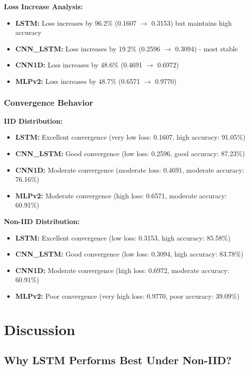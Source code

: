 \documentclass[12pt,a4paper]{article}
\begin{document}
\textbf{Loss Increase Analysis:}
\begin{itemize}
    \item \textbf{LSTM:} Loss increases by 96.2\% (0.1607 $\rightarrow$ 0.3153) but maintains high accuracy
    \item \textbf{CNN\_LSTM:} Loss increases by 19.2\% (0.2596 $\rightarrow$ 0.3094) - most stable
    \item \textbf{CNN1D:} Loss increases by 48.6\% (0.4691 $\rightarrow$ 0.6972)
    \item \textbf{MLPv2:} Loss increases by 48.7\% (0.6571 $\rightarrow$ 0.9770)
\end{itemize}

\subsubsection{Convergence Behavior}

\textbf{IID Distribution:}
\begin{itemize}
    \item \textbf{LSTM:} Excellent convergence (very low loss: 0.1607, high accuracy: 91.05\%)
    \item \textbf{CNN\_LSTM:} Good convergence (low loss: 0.2596, good accuracy: 87.23\%)
    \item \textbf{CNN1D:} Moderate convergence (moderate loss: 0.4691, moderate accuracy: 76.16\%)
    \item \textbf{MLPv2:} Moderate convergence (high loss: 0.6571, moderate accuracy: 60.91\%)
\end{itemize}

\textbf{Non-IID Distribution:}
\begin{itemize}
    \item \textbf{LSTM:} Excellent convergence (low loss: 0.3153, high accuracy: 85.58\%)
    \item \textbf{CNN\_LSTM:} Good convergence (low loss: 0.3094, high accuracy: 83.78\%)
    \item \textbf{CNN1D:} Moderate convergence (high loss: 0.6972, moderate accuracy: 60.91\%)
    \item \textbf{MLPv2:} Poor convergence (very high loss: 0.9770, poor accuracy: 39.09\%)
\end{itemize}

\section{Discussion}

\subsection{Why LSTM Performs Best Under Non-IID?}
\end{document}
